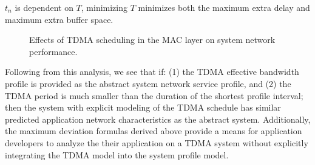$t_{n}$ is dependent on $T$, minimizing $T$ minimizes both the maximum
extra delay and maximum extra buffer space.
\begin{figure}[ht!]
  \centering
  \caption{Effects of TDMA scheduling in the MAC layer on system
    network performance.}
  \label{fig:tdma}
\end{figure}

Following from this analysis, we see that if: (1) the TDMA effective
bandwidth profile is provided as the abstract system network service
profile, and (2) the TDMA period is much smaller than the duration of
the shortest profile interval; then the system with explicit modeling
of the TDMA schedule has similar predicted application network
characteristics as the abstract system.  Additionally, the maximum
deviation formulas derived above provide a means for application
developers to analyze the their application on a TDMA system without
explicitly integrating the TDMA model into the system profile model.

